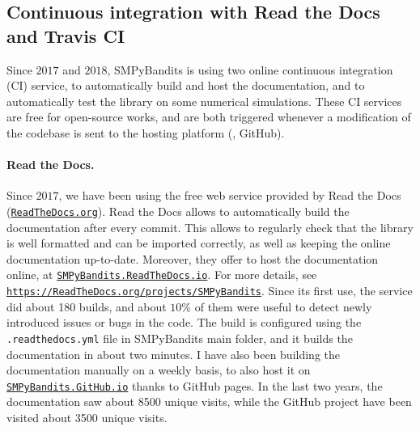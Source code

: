 \subsection{Continuous integration with Read the Docs and Travis CI}


Since $2017$ and $2018$, SMPyBandits is using two online continuous integration (CI) service, to automatically build and host the documentation, and to automatically test the library on some numerical simulations.
%
These CI services are free for open-source works, and are both triggered whenever a modification of the codebase is sent to the hosting platform (\ie, GitHub).

\paragraph{Read the Docs.}
Since $2017$, we have been using the free web service provided by Read the Docs (\href{https://readthedocs.org/}{\texttt{ReadTheDocs.org}}).
Read the Docs allows to automatically build the documentation after every commit. This allows to regularly check that the library is well formatted and can be imported correctly, as well as keeping the online documentation up-to-date.
Moreover, they offer to host the documentation online, at \href{https://smpybandits.rtfd.io/}{\texttt{SMPyBandits.ReadTheDocs.io}}.
For more details, see \href{https://readthedocs.org/projects/smpybandits/}{\texttt{https://ReadTheDocs.org/projects/SMPyBandits}}.
%
Since its first use, the service did about 180 builds, and about $10\%$ of them were useful to detect newly introduced issues or bugs in the code.
The build is configured using the \texttt{.readthedocs.yml} file in SMPyBandits main folder, and it builds the documentation in about two minutes.
I have also been building the documentation manually on a weekly basis, to also host it on \href{https://smpybandits.github.io/}{\texttt{SMPyBandits.GitHub.io}} thanks to GitHub pages.
In the last two years, the documentation saw about 8500 unique visits, while the GitHub project have been visited about 3500 unique visits.


